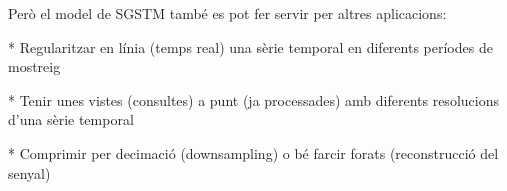 Però el model de SGSTM també es pot fer servir per altres aplicacions:

* Regularitzar en línia (temps real) una sèrie temporal en diferents períodes de mostreig

* Tenir unes vistes (consultes) a punt (ja processades) amb diferents resolucions d'una sèrie temporal

* Comprimir per decimació (downsampling) o bé farcir forats (reconstrucció del senyal)














